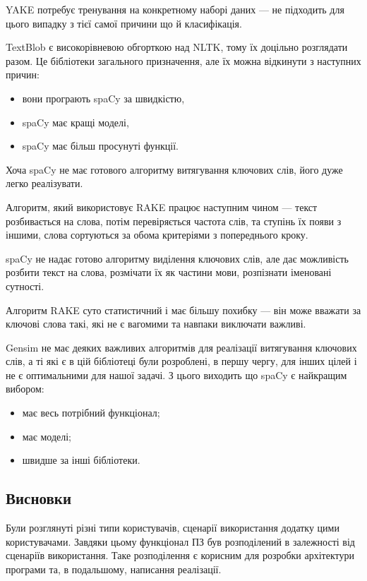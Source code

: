 \documentclass[14pt]{extarticle}
\begin{document}
  YAKE потребує тренування на конкретному наборі даних ---
  не підходить для цього випадку з тієї самої причини що й класифікація.

  TextBlob є високорівневою обгорткою над NLTK,
  тому їх доцільно розглядати разом.
  Це бібліотеки загального призначення,
  але їх можна відкинути з наступних причин:
  \begin{itemize}[labelindent=\dimexpr{}\relax, leftmargin=*]
    \item вони програють spaCy за швидкістю,
    \item spaCy має кращі моделі,
    \item spaCy має більш просунуті функції.
  \end{itemize}

  Хоча spaCy не має готового алгоритму витягування ключових слів,
  його дуже легко реалізувати.

  Алгоритм, який використовує RAKE працює наступним чином ---
  текст розбивається на слова, потім перевіряється частота слів,
  та ступінь їх появи з іншими,
  слова сортуються за обома критеріями з попереднього кроку.

  spaCy не надає готово алгоритму виділення ключових слів,
  але дає можливість розбити текст на слова, розмічати їх як частини мови,
  розпізнати іменовані сутності.

  Алгоритм RAKE суто статистичний і має більшу похибку ---
  він може вважати за ключові слова такі,
  які не є вагомими та навпаки виключати важливі.

  Gensim не має деяких важливих алгоритмів
  для реалізації витягування ключових слів,
  а ті які є в цій бібліотеці були розроблені, в першу чергу,
  для інших цілей і не є оптимальними для нашої задачі.
  З цього виходить що spaCy є найкращим вибором:
  \begin{itemize}[labelindent=\dimexpr{}\relax, leftmargin=*]
    \item має весь потрібний функціонал;
    \item має моделі;
    \item швидше за інші бібліотеки.
  \end{itemize}

  \subsection{Висновки}
  Були розглянуті різні типи користувачів,
  сценарії використання додатку цими користувачами.
  Завдяки цьому функціонал ПЗ був розподілений в залежності
  від сценаріїв використання.
  Таке розподілення є корисним для розробки архітектури програми та,
  в подальшому, написання реалізації.
\end{document}
